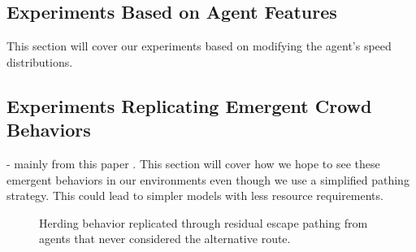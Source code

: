 \documentclass[12pt,letterpaper]{article}
\begin{document}
\subsection{Experiments Based on Agent Features} \label{expAgent}

This section will cover our experiments based on modifying the agent's speed distributions.


\subsection{Experiments Replicating Emergent Crowd Behaviors} \label{emergentBehavior}
- mainly from this paper \cite{almeidaCrowdSimulationModeling2013}  .  This section will cover how we hope to see these emergent behaviors in our environments even though we use a simplified pathing strategy.  This could lead to simpler models with less resource requirements.



\begin{figure}[!htbp]
  \centering
  \hfill
  \caption{Herding behavior replicated through residual escape pathing from agents that never considered the alternative route.}
\end{figure}
\end{document}
